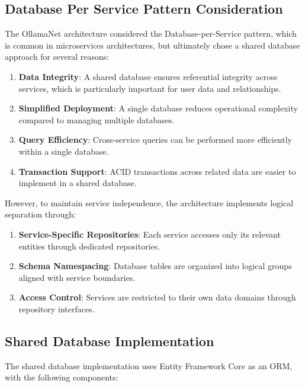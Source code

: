 \subsection{Database Per Service Pattern Consideration}

The OllamaNet architecture considered the Database-per-Service pattern, which is common in microservices architectures, but ultimately chose a shared database approach for several reasons:

\begin{enumerate}
   \item \textbf{Data Integrity}: A shared database ensures referential integrity across services, which is particularly important for user data and relationships.

   \item \textbf{Simplified Deployment}: A single database reduces operational complexity compared to managing multiple databases.

   \item \textbf{Query Efficiency}: Cross-service queries can be performed more efficiently within a single database.

   \item \textbf{Transaction Support}: ACID transactions across related data are easier to implement in a shared database.
\end{enumerate}

However, to maintain service independence, the architecture implements logical separation through:

\begin{enumerate}
   \item \textbf{Service-Specific Repositories}: Each service accesses only its relevant entities through dedicated repositories.

   \item \textbf{Schema Namespacing}: Database tables are organized into logical groups aligned with service boundaries.

   \item \textbf{Access Control}: Services are restricted to their own data domains through repository interfaces.
\end{enumerate}

\subsection{Shared Database Implementation}

The shared database implementation uses Entity Framework Core as an ORM, with the following components:

